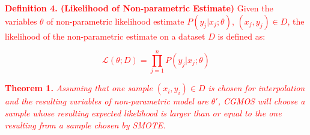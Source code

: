 \documentclass[10pt,journal,compsoc]{IEEEtran}
\begin{document}
\textcolor{red}{\noindent\textbf{Definition 4. (Likelihood of Non-parametric Estimate)} Given the variables $\theta$ of non-parametric likelihood estimate $P(y_j|x_j; \theta)$, $(x_j, y_j)\in D$, the likelihood of the non-parametric estimate on a dataset $D$ is defined as:}

\textcolor{red}{
\begin{equation}
\mathcal{L}(\theta; D)=\prod_{j=1}^n P(y_j|x_j; \theta)
\end{equation}}

\textcolor{red}{\noindent \textbf{Theorem 1.} \textit{Assuming that one sample $(x_i, y_i)\in D$ is chosen for interpolation and the resulting variables of non-parametric model are $\theta'$, CGMOS will choose a sample whose resulting expected likelihood is larger than or equal to the one resulting from a sample chosen by SMOTE.}
\newline}
\end{document}
